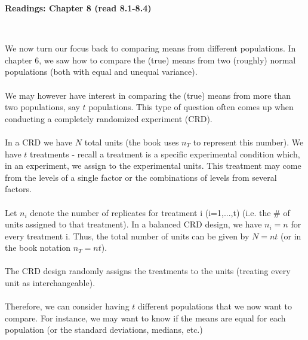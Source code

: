  \begin{center}\large\textbf{Readings: Chapter 8 (read 8.1-8.4)}\\
\normalsize \end{center}
\large ~\hrulefill
~\\
\normalsize

We now turn our focus back to comparing means from different populations.  In chapter 6, we saw how to compare the (true) means from two (roughly) normal populations (both with equal and unequal variance).\\~\\

We may however have interest in comparing the (true) means from more than two populations, say $t$ populations.  This type of question often comes up when conducting a completely randomized experiment (CRD).\\~\\

In a CRD we have $N$ total units (the book uses $n_T$ to represent this number).  We have $t$ treatments - recall a treatment is a specific experimental condition which, in an experiment, we assign to the experimental units.  This treatment may come from the levels of a single factor or the combinations of levels from several factors.\\~\\

Let $n_i$ denote the number of replicates for treatment i (i=1,...,t) (i.e. the \# of units assigned to that treatment).  In a balanced CRD design, we have $n_i=n$ for every treatment i.  Thus, the total number of units can be given by $N=nt$ (or in the book notation $n_T=nt$). \\~\\

The CRD design randomly assigns the treatments to the units (treating every unit as interchangeable).\\~\\

Therefore, we can consider having $t$ different populations that we now want to compare.  For instance, we may want to know if the means are equal for each population (or the standard deviations, medians, etc.)\\~\\
  
\newpage

